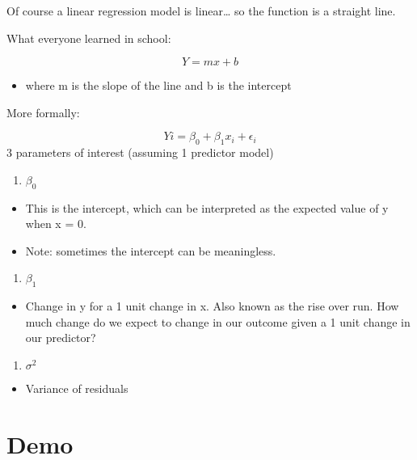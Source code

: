 \documentclass[
]{book}
\providecommand{\tightlist}{%
  \setlength{\itemsep}{0pt}\setlength{\parskip}{0pt}}
\begin{document}
Of course a linear regression model is linear\ldots{} so the function is a straight line.

What everyone learned in school:

\[
Y = mx + b
\]

\begin{itemize}
\tightlist
\item
  where m is the slope of the line and b is the intercept
\end{itemize}

More formally:

\[
Yi = \beta_0 + \beta_1x_i  + \epsilon_i
\]
3 parameters of interest (assuming 1 predictor model)

\begin{enumerate}
\def\labelenumi{\arabic{enumi}.}
\tightlist
\item
  \(\beta_0\)
\end{enumerate}

\begin{itemize}
\tightlist
\item
  This is the intercept, which can be interpreted as the expected value of y when x = 0.
\item
  Note: sometimes the intercept can be meaningless.
\end{itemize}

\begin{enumerate}
\def\labelenumi{\arabic{enumi}.}
\setcounter{enumi}{1}
\tightlist
\item
  \(\beta_1\)
\end{enumerate}

\begin{itemize}
\tightlist
\item
  Change in y for a 1 unit change in x. Also known as the rise over run. How much change do we expect to change in our outcome given a 1 unit change in our predictor?
\end{itemize}

\begin{enumerate}
\def\labelenumi{\arabic{enumi}.}
\setcounter{enumi}{2}
\tightlist
\item
  \(\sigma^2\)
\end{enumerate}

\begin{itemize}
\tightlist
\item
  Variance of residuals
\end{itemize}

\hypertarget{demo}{%
\section{Demo}\label{demo}}
\end{document}

